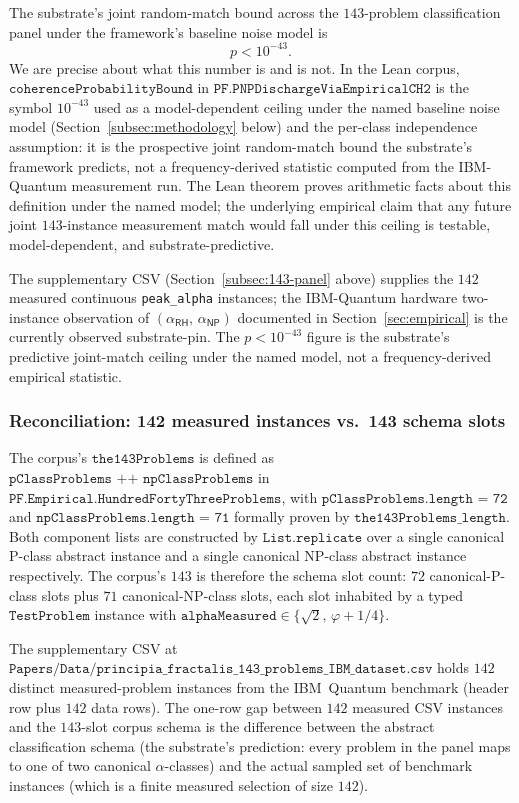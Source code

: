 \documentclass[11pt,a4paper]{amsart}
\theoremstyle{plain}
\theoremstyle{definition}
\begin{document}
The substrate's joint random-match bound across the $143$-problem classification panel under the framework's baseline noise model is
\[
p < 10^{-43}.
\]
We are precise about what this number is and is not. In the Lean corpus, $\texttt{coherenceProbabilityBound}$ in $\texttt{PF.PNPDischargeViaEmpiricalCH2}$ is the symbol $10^{-43}$ used as a model-dependent ceiling under the named baseline noise model (Section~\ref{subsec:methodology} below) and the per-class independence assumption: it is the prospective joint random-match bound the substrate's framework predicts, not a frequency-derived statistic computed from the IBM-Quantum measurement run. The Lean theorem proves arithmetic facts about this definition under the named model; the underlying empirical claim that any future joint $143$-instance measurement match would fall under this ceiling is testable, model-dependent, and substrate-predictive.

The supplementary CSV (Section~\ref{subsec:143-panel} above) supplies the $142$ measured continuous \texttt{peak\_alpha} instances; the IBM-Quantum hardware two-instance observation of $(\alpha_{\textsf{RH}},\,\alpha_{\textsf{NP}})$ documented in Section~\ref{sec:empirical} is the currently observed substrate-pin. The $p < 10^{-43}$ figure is the substrate's predictive joint-match ceiling under the named model, not a frequency-derived empirical statistic.

\subsubsection*{Reconciliation: 142 measured instances vs.\ 143 schema slots}

The corpus's $\texttt{the143Problems}$ is defined as $\texttt{pClassProblems ++ npClassProblems}$ in $\texttt{PF.Empirical.HundredFortyThreeProblems}$, with $\texttt{pClassProblems.length = 72}$ and $\texttt{npClassProblems.length = 71}$ formally proven by $\texttt{the143Problems\_length}$. Both component lists are constructed by $\texttt{List.replicate}$ over a single canonical P-class abstract instance and a single canonical NP-class abstract instance respectively. The corpus's $143$ is therefore the schema slot count: $72$ canonical-P-class slots plus $71$ canonical-NP-class slots, each slot inhabited by a typed $\texttt{TestProblem}$ instance with $\texttt{alphaMeasured} \in \{\sqrt{2},\,\varphi+1/4\}$.

The supplementary CSV at $\texttt{Papers/Data/principia\_fractalis\_143\_problems\_IBM\_dataset.csv}$ holds $142$ distinct measured-problem instances from the IBM~Quantum benchmark (header row plus $142$ data rows). The one-row gap between $142$ measured CSV instances and the $143$-slot corpus schema is the difference between the abstract classification schema (the substrate's prediction: every problem in the panel maps to one of two canonical $\alpha$-classes) and the actual sampled set of benchmark instances (which is a finite measured selection of size $142$).
\end{document}
